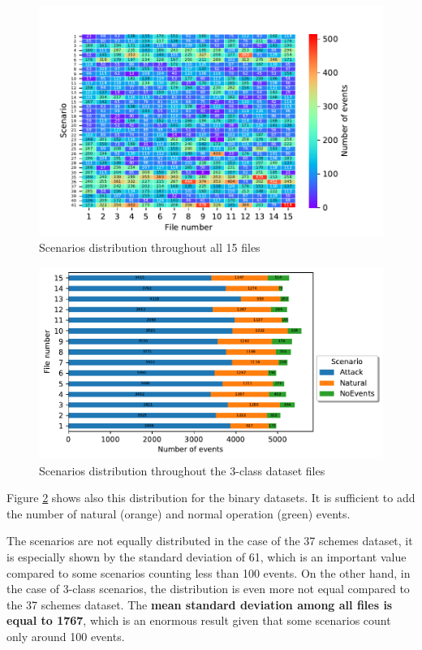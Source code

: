 \begin{figure}[H]
    \centering
    \includegraphics[]{images/distr_allscen.pdf}
    \caption{Scenarios distribution throughout all 15 files} \label{fig:scen_distro_37}
\end{figure}

\begin{figure}[H]
    \centering
    \includegraphics[]{images/distr_3classes.pdf}
    \caption{Scenarios distribution throughout the 3-class dataset files}
    \label{fig:scen_distro_file}
\end{figure}

Figure \ref{fig:scen_distro_file} shows also this distribution for the binary datasets. It is sufficient to add the number of natural (orange) and normal operation (green) events.

The scenarios are not equally distributed in the case of the 37 schemes dataset, it is especially shown by the standard deviation of 61, which is an important value compared to some scenarios counting less than 100 events. On the other hand, in the case of 3-class scenarios, the distribution is even more not equal compared to the 37 schemes dataset. The \textbf{mean standard deviation among all files is equal to 1767}, which is an enormous result given that some scenarios count only around 100 events.


